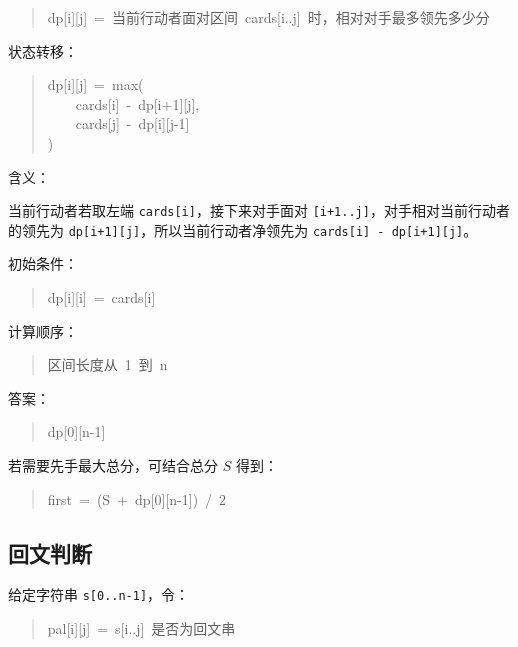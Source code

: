 \documentclass[UTF8,zihao=-4]{ctexart}
\begin{document}
\begin{quote}
\small\ttfamily\raggedright
\relax dp[i][j]\ =\ 当前行动者面对区间\ cards[i..j]\ 时，相对对手最多领先多少分\\
\end{quote}

状态转移：

\begin{quote}
\small\ttfamily\raggedright
\relax dp[i][j]\ =\ max(\\
\relax \ \ \ \ cards[i]\ -\ dp[i+1][j],\\
\relax \ \ \ \ cards[j]\ -\ dp[i][j-1]\\
\relax )\\
\end{quote}

含义：

当前行动者若取左端 \texttt{cards[i]}，接下来对手面对 \texttt{[i+1..j]}，对手相对当前行动者的领先为 \texttt{dp[i+1][j]}，所以当前行动者净领先为 \texttt{cards[i] - dp[i+1][j]}。

初始条件：

\begin{quote}
\small\ttfamily\raggedright
\relax dp[i][i]\ =\ cards[i]\\
\end{quote}

计算顺序：

\begin{quote}
\small\ttfamily\raggedright
\relax 区间长度从\ 1\ 到\ n\\
\end{quote}

答案：

\begin{quote}
\small\ttfamily\raggedright
\relax dp[0][n-1]\\
\end{quote}

若需要先手最大总分，可结合总分 $S$ 得到：

\begin{quote}
\small\ttfamily\raggedright
\relax first\ =\ (S\ +\ dp[0][n-1])\ /\ 2\\
\end{quote}

\subsection*{回文判断}

给定字符串 \texttt{s[0..n-1]}，令：

\begin{quote}
\small\ttfamily\raggedright
\relax pal[i][j]\ =\ s[i..j]\ 是否为回文串\\
\end{quote}
\end{document}
